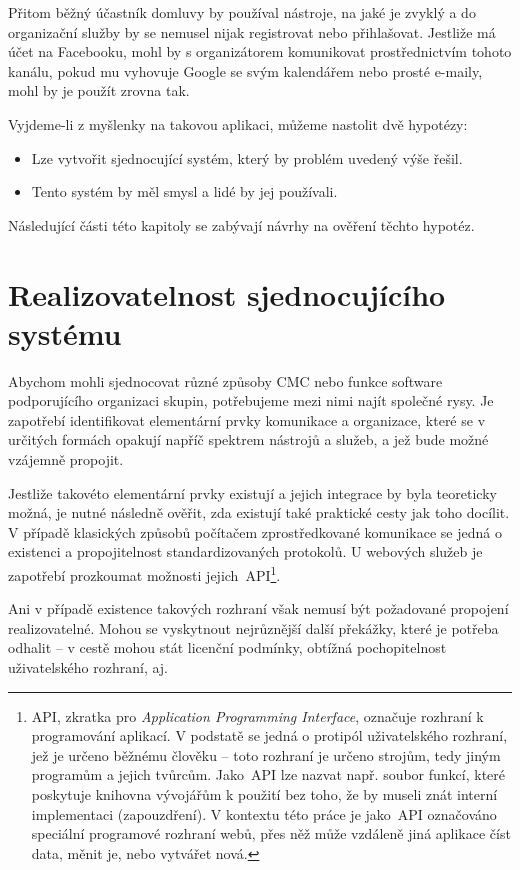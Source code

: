 \documentclass[12pt,oneside,final]{fithesis2}
\begin{document}
Přitom běžný účastník domluvy by používal nástroje, na jaké je zvyklý a do organizační služby by se nemusel nijak registrovat nebo přihlašovat. Jestliže má účet na Facebooku, mohl by s organizátorem komunikovat pro\-střed\-nic\-tvím tohoto kanálu, pokud mu vyhovuje Google se svým kalendářem nebo prosté e-maily, mohl by je použít zrovna tak.

Vyjdeme-li z myšlenky na takovou aplikaci, můžeme nastolit dvě hypotézy:

\begin{itemize}
    \item Lze vytvořit sjednocující systém, který by problém uvedený výše řešil.
    \item Tento systém by měl smysl a lidé by jej používali.
\end{itemize}

Následující části této kapitoly se zabývají návrhy na ověření těchto hypotéz.


\section{Realizovatelnost sjednocujícího systému}\label{realizability}
Abychom mohli sjednocovat různé způsoby CMC nebo funkce software podporujícího organizaci skupin, potřebujeme mezi nimi najít společné rysy. Je zapotřebí identifikovat elementární prvky komunikace a organizace, které se v určitých formách opakují napříč spektrem nástrojů a služeb, a jež bude možné vzájemně propojit.

Jestliže takovéto elementární prvky existují a jejich integrace by byla teoreticky možná, je nutné následně ověřit, zda existují také praktické cesty jak toho docílit. V případě klasických způsobů počítačem zprostředkované komunikace se jedná o existenci a propojitelnost standardizovaných protokolů. U webových služeb je zapotřebí prozkoumat možnosti jejich~API\footnote{API, zkratka pro \emph{Application Programming Interface}, označuje rozhraní k programování aplikací. V podstatě se jedná o protipól uživatelského rozhraní, jež je určeno běžnému člověku -- toto rozhraní je určeno strojům, tedy jiným programům a jejich tvůrcům. Jako~API lze nazvat např. soubor funkcí, které poskytuje knihovna vývojářům k použití bez toho, že by museli znát interní implementaci (zapouzdření). V kontextu této práce je jako~API označováno speciální programové rozhraní webů, přes něž může vzdáleně jiná aplikace číst data, měnit je, nebo vytvářet nová.}.

Ani v případě existence takových rozhraní však nemusí být požadované propojení realizovatelné. Mohou se vyskytnout nejrůznější další překážky, které je potřeba odhalit -- v cestě mohou stát licenční podmínky, obtížná pochopitelnost uživatelského rozhraní, aj.
\end{document}
